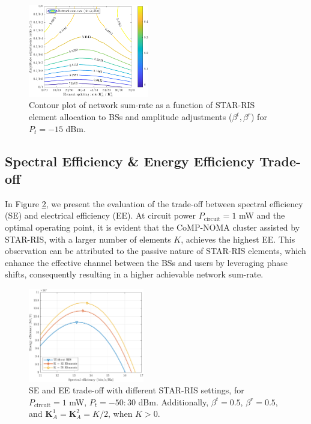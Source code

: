 \documentclass[conference]{IEEEtran}
\begin{document}
\begin{figure}[t!]
    \centering
    \includegraphics[width=0.47\textwidth]{figs/dynamic_s.pdf}
    \caption{Contour plot of network sum-rate as a function of STAR-RIS element allocation to BSs and amplitude adjustments ($\beta^t, \beta^r$) for $P_t =-15$ dBm.}
    \label{fig:dynamic}
\end{figure}

\subsection{Spectral Efficiency \& Energy Efficiency Trade-off}
In Figure \ref{fig:se_vs_ee}, we present the evaluation of the trade-off between spectral efficiency (SE) and electrical efficiency (EE). At circuit power $P_{\text{circuit}} = 1$ mW and the optimal operating point, it is evident that the CoMP-NOMA cluster assisted by STAR-RIS, with a larger number of elements $K$, achieves the highest EE. This observation can be attributed to the passive nature of STAR-RIS elements, which enhance the effective channel between the BSs and users by leveraging phase shifts, consequently resulting in a higher achievable network sum-rate.
\begin{figure}[t!]
    \centering
    \includegraphics[width=0.45\textwidth]{figs/se_vs_ee.pdf}
    \caption{SE and EE trade-off with different STAR-RIS settings, for $P_{\text{circuit}} = 1$ mW, $P_t=-50:30$ dBm. Additionally, $\beta^t=0.5$, $\beta^r=0.5$, and $\textbf{K}_A^1=\textbf{K}_A^2=K/2$, when $K > 0$.}
    \label{fig:se_vs_ee}
\end{figure}
\end{document}
